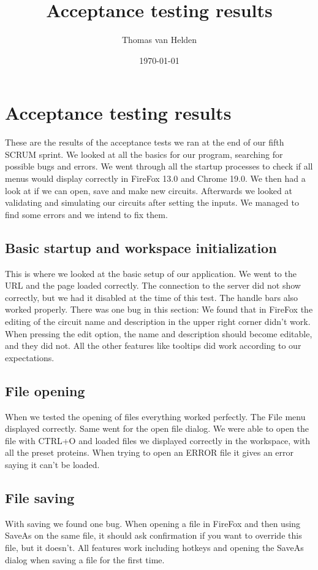 \documentclass[a4paper]{article}
\begin{document}
\title{Acceptance testing results}
\author{Thomas van Helden}
\date{\today}
\maketitle



\section{Acceptance testing results}
These are the results of the acceptance tests we ran at the end of our fifth SCRUM sprint. We looked at all the basics for our program, searching for possible bugs and errors. We went through all the startup processes to check if all menus would display correctly in FireFox 13.0 and Chrome 19.0. We then had a look at if we can open, save and make new circuits. Afterwards we looked at validating and simulating our circuits after setting the inputs. We managed to find some errors and we intend to fix them.

\subsection{Basic startup and workspace initialization}
This is where we looked at the basic setup  of our application. We went to the URL and the page loaded correctly. The connection to the server did not show correctly, but we had it disabled at the time of this test. The handle bars also worked properly. There was one bug in this section: We found that in FireFox the editing of the circuit name and description in the upper right corner didn't work. When pressing the edit option, the name and description should become editable, and they did not.
All the other features like tooltips did work according to our expectations.

\subsection{File opening}
When we tested the opening of files everything worked perfectly. The File menu displayed correctly. Same went for the open file dialog. We were able to open the file with CTRL+O and loaded files we displayed correctly in the workspace, with all the preset proteins.
When trying to open an ERROR file it gives an error saying it can't be loaded.

\subsection{File saving}
With saving we found one bug. When opening a file in FireFox and then using SaveAs on the same file, it should ask confirmation if you want to override this file, but it doesn't. All features work including hotkeys and opening the SaveAs dialog when saving a file for the first time.
\end{document}
